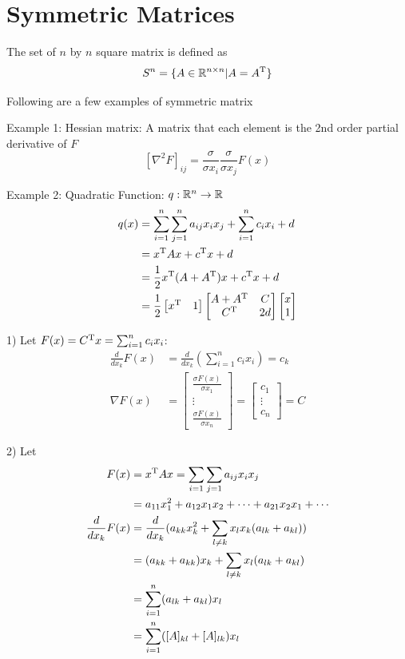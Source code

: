 \section{Symmetric Matrices}
The set of $n$ by $n$ square matrix is defined as
$$S^n = \{A\in \mathbb{R}^{n\times n} | A = A^{{\rm T}} \}$$

\vspace{0.3cm}
Following are a few examples of symmetric matrix

Example 1: Hessian matrix: A matrix that each element is the 2nd order partial derivative of $F$
$$[\nabla^2 F]_{ij} = \frac{\sigma}{\sigma x_i}\frac{\sigma}{\sigma x_j}F(x)$$

Example 2: Quadratic Function: $q: \mathbb{R}^n \rightarrow \mathbb{R}$
\begin{align*}
q(x) &= \sum^n_{i=1}\sum^n_{j=1}a_{ij}x_ix_j + \sum^n_{i=1}c_ix_i + d\\
&= x^{\trans}Ax + c^{\trans}x + d\\
&= \frac{1}{2}x^{\trans}(A + A^{\trans})x + c^{\trans}x + d\\
&= \frac{1}{2}
\begin{bmatrix}%
x^{\trans}& 1
\end{bmatrix}
\begin{bmatrix}%
A + A^{\trans} & C\\
C^{\trans} & 2d
\end{bmatrix}
\begin{bmatrix}%
x\\
1
\end{bmatrix}
\end{align*}


1) Let $F(x) = C^{{\rm T}}x = \sum^n_{i=1}c_ix_i$:
\begin{align*}
\frac{d}{dx_k}F(x) &= \frac{d}{dx_k}(\sum^n_{i=1}c_ix_i) = c_k\\
\nabla F(x) &= 
\begin{bmatrix}%
\frac{\sigma F(x)}{\sigma x_1}\\
\vdots\\
\frac{\sigma F(x)}{\sigma x_n}
\end{bmatrix}=
\begin{bmatrix}%
c_1\\
\vdots\\
c_n
\end{bmatrix} = C
\end{align*}

2) Let
\begin{align*}
F(x) &= x^{{\rm T}}Ax = \sum_{i=1}\sum_{j=1}a_{ij}x_ix_j\\
&= a_{11}x_1^2 + a_{12}x_1x_2 + \cdots + a_{21}x_2x_1 +\cdots\\
\frac{d}{dx_k}F(x) &= \frac{d}{dx_k}(a_{kk}x_k^2 + \sum_{l\neq k}x_lx_k(a_{lk}+a_{kl}))\\
&= (a_{kk} + a_{kk})x_k + \sum_{l\neq k}x_l(a_{lk} + a_{kl}) \\
&= \sum^n_{i=1}(a_{lk} + a_{kl})x_l\\
&= \sum^n_{i=1}([A]_{kl} + [A]_{lk})x_l
\end{align*}

